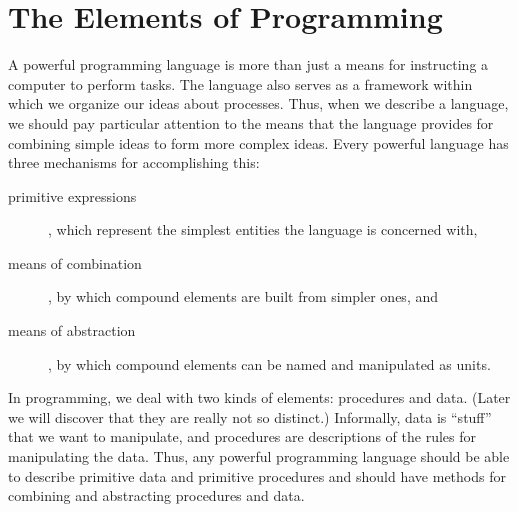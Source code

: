 \section{The Elements of Programming}
\label{Section 1.1}

A powerful programming language is more than just a means for instructing a computer to perform tasks.
The language also serves as a framework within which we organize our ideas about processes.
Thus, when we describe a language, we should pay particular attention to the means that the language provides for combining simple ideas to form more complex ideas.
Every powerful language has three mechanisms for accomplishing this:
\begin{description}

	\item[primitive expressions],
	which represent the simplest entities the language is concerned with,

	\item[means of combination],
	by which compound elements are built from simpler ones, and

	\item[means of abstraction],
	by which compound elements can be named and manipulated as units.

\end{description}

In programming, we deal with two kinds of elements:
procedures and data.
(Later we will discover that they are really not so distinct.)
Informally, data is “stuff” that we want to manipulate, and procedures are descriptions of the rules for manipulating the data.
Thus, any powerful programming language should be able to describe primitive data and primitive procedures and should have methods for combining and abstracting procedures and data.

